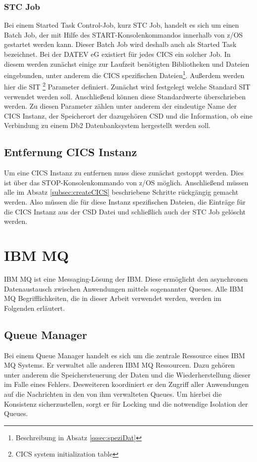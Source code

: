 \subsubsection{STC Job}
Bei einem Started Task Control-Job, kurz STC Job, handelt es sich um einen Batch Job, der mit Hilfe des \glqq START\grqq-Konsolenkommandos innerhalb von z/OS gestartet werden kann.
Dieser Batch Job wird deshalb auch als Started Task bezeichnet.\cite{Cassier.2007}
Bei der DATEV eG existiert für jedes CICS ein solcher Job.
In diesem werden zunächst einige zur Laufzeit benötigten Bibliotheken und Dateien eingebunden, unter anderem die CICS spezifischen Dateien\footnote{Beschreibung in Absatz \ref{sssec:speziDat}}.
Außerdem werden hier die SIT \footnote{CICS system initialization table} Parameter definiert.
Zunächst wird festgelegt welche Standard SIT verwendet werden soll.
Anschließend können diese Standardwerte überschrieben werden.
Zu diesen Parameter zählen unter anderem der eindeutige Name der CICS Instanz, der Speicherort der dazugehören CSD und die Information, ob eine Verbindung zu einem Db2 Datenbanksystem hergestellt werden soll.

\subsection{Entfernung CICS Instanz}
Um eine CICS Instanz zu entfernen muss diese zunächst gestoppt werden.
Dies ist über das \glqq STOP\grqq-Konsolenkommando von z/OS möglich.
Anschließend müssen alle im Absatz \ref{subsec:createCICS} beschriebene Schritte rückgängig gemacht werden.
Also müssen die für diese Instanz spezifischen Dateien, die Einträge für die CICS Instanz aus der CSD Datei und schließlich auch der STC Job gelöscht werden.

\section{IBM MQ}\label{sec:mq}
IBM MQ ist eine Messaging-Lösung der IBM.
Diese ermöglicht den asynchronen Datenaustausch zwischen Anwendungen mittels sogenannter Queues.
Alle IBM MQ Begrifflichkeiten, die in dieser Arbeit verwendet werden, werden im Folgenden erläutert.
\cite{Aranha.2013}

\subsection{Queue Manager}
Bei einem Queue Manager handelt es sich um die zentrale Ressource eines IBM MQ Systems.
Er verwaltet  alle anderen IBM MQ Ressourcen.
Dazu gehören unter anderem die Speichersteuerung der Daten und die Wiederherstellung dieser im Falle eines Fehlers.
Desweiteren koordiniert er den Zugriff aller Anwendungen auf die Nachrichten in den von ihm verwalteten Queues.
Um hierbei die Konsistenz sicherzustellen, sorgt er für Locking und die notwendige Isolation der Queues.
\cite{Aranha.2013}

